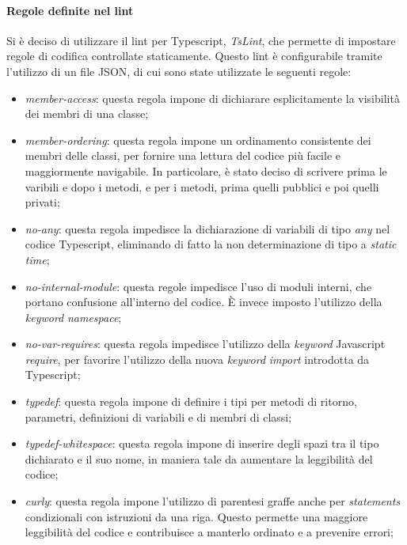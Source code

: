                 \paragraph*{Regole definite nel lint}
                Si \`e deciso di utilizzare il lint per Typescript, \textit{TsLint}, che permette di impostare regole di codifica controllate staticamente.
                Questo lint \`e configurabile tramite l'utilizzo di un file JSON, di cui sono state utilizzate le seguenti regole:
                \begin{itemize}

                \item \textit{member-access}: questa regola impone di dichiarare esplicitamente la visibilit\`a dei membri di una classe;
                \item \textit{member-ordering}: questa regola impone un ordinamento consistente dei membri delle classi, per fornire una lettura del codice pi\`u facile e maggiormente navigabile. In particolare, \`e stato deciso di scrivere prima le varibili e dopo i metodi, e per i metodi, prima quelli pubblici e poi quelli privati;
                \item \textit{no-any}: questa regola impedisce la dichiarazione di variabili di tipo \textit{any} nel codice Typescript, eliminando di fatto la non determinazione di tipo a \textit{static time};
                \item \textit{no-internal-module}: questa regole impedisce l'uso di moduli interni, che portano confusione all'interno del codice. \`E invece imposto l'utilizzo della \textit{keyword} \textit{namespace};
                \item \textit{no-var-requires}: questa regola impedisce l'utilizzo della \textit{keyword} Javascript \textit{require}, per favorire l'utilizzo della nuova \textit{keyword} \textit{import} introdotta da Typescript;
                \item \textit{typedef}: questa regola impone di definire i tipi per metodi di ritorno, parametri, definizioni di variabili e di membri di classi;
                \item \textit{typedef-whitespace}: questa regola impone di inserire degli spazi tra il tipo dichiarato e il suo nome, in maniera tale da aumentare la leggibilit\`a del codice;
                \item \textit{curly}: questa regola impone l'utilizzo di parentesi graffe anche per \textit{statements} condizionali con istruzioni da una riga. Questo permette una maggiore leggibilit\`a del codice e contribuisce a manterlo ordinato e a prevenire errori;

\end{itemize}
